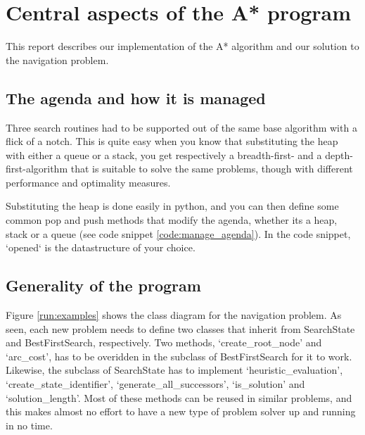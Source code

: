 \section{Central aspects of the A* program}
This report describes our implementation of the A* algorithm and our solution to the navigation problem.

\subsection{The agenda and how it is managed}

Three search routines had to be supported out of the same base algorithm with a flick of a notch. This is quite easy when you know that substituting the heap with either a queue or a stack, you get respectively a breadth-first- and a depth-first-algorithm that is suitable to solve the same problems, though with different performance and optimality measures.

Substituting the heap is done easily in python, and you can then define some common pop and push methods that modify the agenda, whether its a heap, stack or a queue (see code snippet \ref{code:manage_agenda}). In the code snippet, `opened` is the datastructure of your choice.



\subsection{Generality of the program}



Figure \ref{run:examples} shows the class diagram for the navigation problem. As seen, each new problem needs to define two classes that inherit from SearchState and BestFirstSearch, respectively. Two methods, `create\_root\_node' and `arc\_cost', has to be overidden in the subclass of BestFirstSearch for it to work. Likewise, the subclass of SearchState has to implement `heuristic\_evaluation', `create\_state\_identifier', `generate\_all\_successors', `is\_solution' and `solution\_length'. Most of these methods can be reused in similar problems, and this makes almost no effort to have a new type of problem solver up and running in no time.

